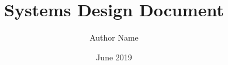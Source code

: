 \documentclass[twoside]{sspace}
\title{Systems Design Document}
\author{Author Name}
\date{June 2019}
\begin{document}
\maketitle %

\makecontrolsheet %
\makeapprovlist
\makerevhist
\maketableofcontents %
\makelistoffigures %
\makelistoftables %
\makelistofalgorithms %
\makeabbreviations %
\makenomenclature %

\makechaptersettings 







\makebibsettings



\makepublications

\makeappendixsettings



\makeindexsettings
\end{document}
